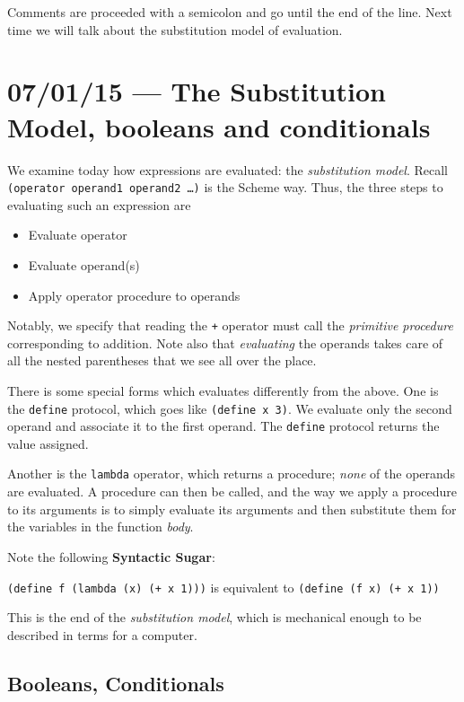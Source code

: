 \documentclass[10pt]{report}
\begin{document}
Comments are proceeded with a semicolon and go until the end of the line. Next time we will talk about the substitution model of evaluation.

\chapter{07/01/15 --- The Substitution Model, booleans and conditionals}

We examine today how expressions are evaluated: the \emph{substitution model}. Recall \texttt{(operator operand1 operand2 \dots)} is the Scheme way. Thus, the three steps to evaluating such an expression are
\begin{itemize}
    \item Evaluate operator
    \item Evaluate operand(s)
    \item Apply operator procedure to operands
\end{itemize}

Notably, we specify that reading the \texttt{+} operator must call the \emph{primitive procedure} corresponding to addition. Note also that \emph{evaluating} the operands takes care of all the nested parentheses that we see all over the place.

There is some special forms which evaluates differently from the above. One is the \texttt{define} protocol, which goes like \texttt{(define x 3)}. We evaluate only the second operand and associate it to the first operand. The \texttt{define} protocol returns the value assigned.

Another is the \texttt{lambda} operator, which returns a procedure; \emph{none} of the operands are evaluated. A procedure can then be called, and the way we apply a procedure to its arguments is to simply evaluate its arguments and then substitute them for the variables in the function \emph{body}. 

\begin{center}
    Note the following \textbf{Syntactic Sugar}:

    \texttt{(define f (lambda (x) (+ x 1)))} is equivalent to \texttt{(define (f x) (+ x 1))}
\end{center}

This is the end of the \emph{substitution model}, which is mechanical enough to be described in terms for a computer.

\section{Booleans, Conditionals}
\end{document}
